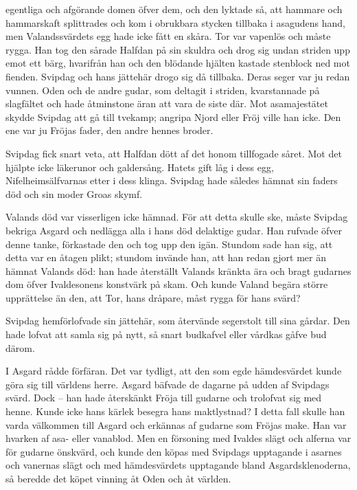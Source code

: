 egentliga och afgörande domen öfver dem, och den lyktade så, att hammare
och hammarskaft splittrades och kom i obrukbara stycken tillbaka i
asagudens hand, men Valandssvärdets egg hade icke fått en skåra. Tor var
vapenlös och måste rygga. Han tog den sårade Halfdan på sin skuldra och
drog sig undan striden upp emot ett bärg, hvarifrån han och den blödande
hjälten kastade stenblock ned mot fienden. Svipdag och hans jättehär
drogo sig då tillbaka. Deras seger var ju redan vunnen. Oden och de
andre gudar, som deltagit i striden, kvarstannade på slagfältet och hade
åtminstone äran att vara de siste där. Mot asamajestätet skydde Svipdag
att gå till tvekamp; angripa Njord eller Fröj ville han icke. Den ene
var ju Fröjas fader, den andre hennes broder.

Svipdag fick snart veta, att Halfdan dött af det honom tillfogade såret.
Mot det hjälpte icke läkerunor och galdersång. Hatets gift låg i dess
egg, Nifelheimsälfvarnas etter i dess klinga. Svipdag hade således
hämnat sin faders död och sin moder Groas skymf.

Valands död var visserligen icke hämnad. För att detta skulle ske, måste
Svipdag bekriga Asgard och nedlägga alla i hans död delaktige gudar. Han
rufvade öfver denne tanke, förkastade den och tog upp den igän. Stundom
sade han sig, att detta var en åtagen plikt; stundom invände han, att
han redan gjort mer än hämnat Valands död: han hade återställt Valands
kränkta ära och bragt gudarnes dom öfver Ivaldesonens konstvärk på skam.
Och kunde Valand begära större upprättelse än den, att Tor, hans
dråpare, måst rygga för hans svärd?

Svipdag hemförlofvade sin jättehär, som återvände segerstolt till sina
gårdar. Den hade lofvat att samla sig på nytt, så snart budkafvel eller
vårdkas gåfve bud därom.

I Asgard rådde förfäran. Det var tydligt, att den som egde hämdesvärdet
kunde göra sig till världens herre. Asgard bäfvade de dagarne på udden
af Svipdags svärd. Dock -- han hade återskänkt Fröja till gudarne och
trolofvat sig med henne. Kunde icke hans kärlek besegra hans
maktlystnad? I detta fall skulle han varda välkommen till Asgard och
erkännas
af gudarne som Fröjas make. Han var hvarken af asa- eller vanablod. Men
en försoning med Ivaldes slägt och alferna var för gudarne önskvärd, och
kunde den köpas med Svipdags upptagande i asarnes och vanernas slägt och
med hämdesvärdets upptagande bland Asgardsklenoderna, så beredde det
köpet vinning åt Oden och åt världen.

\endSecII


